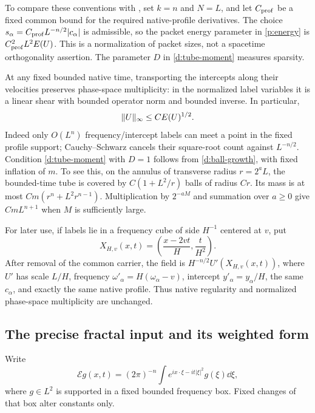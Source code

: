 To compare these conventions with , set $k=n$
and $N=L$, and let $C_{\rm prof}$ be a fixed common bound for the
required native-profile derivatives. The choice
$s_\alpha=C_{\rm prof}L^{-n/2}|c_\alpha|$ is admissible, so the packet
energy parameter in \eqref{p:energy} is $C_{\rm prof}^2L^2E(U)$.
This is a normalization of packet sizes, not a spacetime
orthogonality assertion. The parameter $D$ in
\eqref{d:tube-moment} measures sparsity.

At any fixed bounded native time, transporting the intercepts along
their velocities preserves phase-space multiplicity: in the normalized
label variables it is a linear shear with bounded operator norm and
bounded inverse.  In particular,
\begin{equation}
 \lVert U\rVert_\infty\le C E(U)^{1/2}.
 \label{d:array-sup}
\end{equation}
Indeed only $O(L^n)$ frequency/intercept labels can meet a point in the
fixed profile support; Cauchy--Schwarz cancels their square-root count
against $L^{-n/2}$.
Condition \eqref{d:tube-moment} with $D=1$ follows from
\eqref{d:ball-growth}, with fixed inflation of $m$.  To see this, on the
annulus of transverse radius $r=2^aL$, the bounded-time tube is covered
by $C(1+L^2/r)$ balls of radius $Cr$.  Its mass is at most
$Cm(r^n+L^2r^{n-1})$.  Multiplication by $2^{-aM}$ and summation over
$a\ge0$ give $CmL^{n+1}$ when $M$ is sufficiently large.

For later use, if labels lie in a frequency cube of side $H^{-1}$
centered at $v$, put
\begin{equation}
 X_{H,v}(x,t)=\left(\frac{x-2vt}{H},\frac t{H^2}\right).
 \label{d:parabolic-map}
\end{equation}
After removal of the common carrier, the field is
$H^{-n/2}U'(X_{H,v}(x,t))$, where $U'$ has scale $L/H$, frequency
$\omega'_\alpha=H(\omega_\alpha-v)$, intercept $y'_\alpha=y_\alpha/H$,
the same $c_\alpha$, and exactly the same native profile.  Thus native
regularity and normalized phase-space multiplicity are unchanged.

\subsection{The precise fractal input and its weighted form}

Write
\[
 \mathcal E g(x,t)=(2\pi)^{-n}
      \int e^{ix\cdot\xi-it|\xi|^2}g(\xi)\dd\xi,
\]
where $g\in L^2$ is supported in a fixed bounded frequency box.
Fixed changes of that box alter constants only.

